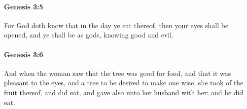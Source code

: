 		\paragraph{Genesis 3:5} %
			\label{GENESIS-3-5}

			For God doth know that in the day ye eat thereof, then your eyes shall be opened, and ye shall be as gods, knowing good and evil.


		\paragraph{Genesis 3:6} %
			\label{GENESIS-3-6}

			And when the woman saw that the tree was good for food, and that it was pleasant to the eyes, and a tree to be desired to make one wise, she took of the fruit thereof, and did eat, and gave also unto her husband with her; and he did eat.


